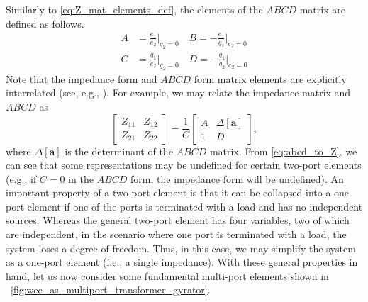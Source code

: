 \documentclass[twocolumn]{autart}
\begin{document}
%
Similarly to \eqref{eq:Z_mat_elements_def}, the elements of the $ABCD$ matrix are defined as follows.
%
\begin{subequations} \label{eq:abcd_mat_elements_def}
        \begin{align}
                A &= \frac{e_1}{e_2} \bigg \vert_{q_2=0}  \quad
                B = - \frac{e_1}{q_2} \bigg \vert_{e_2=0}  \\[1em]
                C &= \frac{q_1}{e_2} \bigg \vert_{q_2=0}  \quad
                D = - \frac{q_1}{q_2} \bigg \vert_{e_2=0} 
        \end{align}
\end{subequations}
%
Note that the impedance form and $ABCD$ form matrix elements are explicitly interrelated (see, e.g., \cite{CircuitFundamental}).
For example, we may relate the impedance matrix and $ABCD$ as
%
\begin{equation}
        \begin{bmatrix}
                Z_{11} & Z_{12} \\ Z_{21} & Z_{22}
        \end{bmatrix}
        =
        \frac{1}{C}
        \begin{bmatrix}
                A & \Delta \left[ \mathbf{a} \right] \\ 1 & D
        \end{bmatrix},
\label{eq:abcd_to_Z}
\end{equation}
%
where $\Delta \left[ \mathbf{a} \right]$ is the determinant of the $ABCD$ matrix.
From \eqref{eq:abcd_to_Z}, we can see that some representations may be undefined for certain two-port elements (e.g., if $C=0$ in the $ABCD$ form, the impedance form will be undefined).
%
An important property of a two-port element is that it can be collapsed into a one-port element if one of the ports is terminated with a load and has no independent sources. 
Whereas the general two-port element has four variables, two of which are independent, in the scenario where one port is terminated with a load, the system loses a degree of freedom. 
Thus, in this case, we may simplify the system as a one-port element (i.e., a single impedance). 
With these general properties in hand, let us now consider some fundamental multi-port elements shown in \figurename~\ref{fig:wec_as_multiport_transformer_gyrator}.

\end{document}

